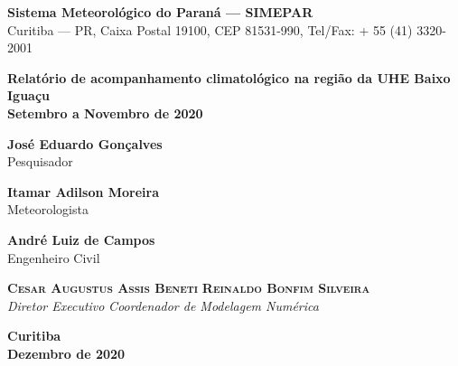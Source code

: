 \documentclass[a4paper,12pt]{article}
\begin{document}
\thispagestyle{empty}

\begin{flushleft}
\textbf{Sistema Meteorológico do Paraná --- SIMEPAR} \\
Curitiba --- PR, Caixa Postal 19100, CEP 81531-990, Tel/Fax: + 55 (41) 3320-2001
\end{flushleft}

\vspace{4.0cm}

\begin{center}
\fontsize{24pt}{28pt}\selectfont
\textbf{Relatório de acompanhamento climatológico na região da UHE Baixo Iguaçu}\\
\vspace{18pt}
\textbf{Setembro a Novembro de 2020}
\end{center}

\vspace{2.0cm}




\begin{center}
\textbf{José Eduardo Gonçalves}\\
Pesquisador\\

\vspace{12pt}

\textbf{Itamar Adilson Moreira}\\
Meteorologista\\

\vspace{12pt}

\textbf{André Luiz de Campos}\\
Engenheiro Civil\\
\end{center}

\vspace{36pt}

{\raggedleft \textbf{\textsc{Cesar Augustus Assis Beneti}}} \hfill \textsc{\textbf{Reinaldo Bonfim Silveira}}\\
\textit{Diretor Executivo} \hfill \textit{Coordenador de Modelagem Numérica}

\vspace{3.0cm}

\begin{center}
\textbf{Curitiba} \\
\textbf{Dezembro de 2020}
\end{center}

\newpage
\end{document}
